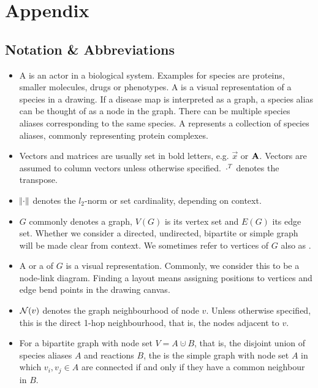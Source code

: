 \documentclass[
	fontsize=10pt, %
	twoside=true, %
	secnumdepth=1, %
  toc=indentunnumbered %
]{kaobook}
\begin{document}
\vfill
\pagebreak


\backmatter %

\appendix %



\chapter{Appendix}

\section{Notation \& Abbreviations}
\begin{itemize}
\item A  is an actor in a biological system. Examples for species
  are proteins, smaller molecules, drugs or phenotypes. A  is a visual representation of a species in a drawing. If a disease map
  is interpreted as a graph, a species alias can be thought of as a node in the
  graph. There can be multiple species
  aliases corresponding to the same species. A 
  represents a collection of species aliases, commonly representing protein
  complexes.
\item Vectors and matrices are usually set in bold letters, e.g. $\vec x$ or
  $\mathbf{A}$. Vectors are assumed to column vectors unless otherwise specified.
  $\cdot^T$ denotes the transpose.
\item $\norm{\cdot}$ denotes the $l_2$-norm or set cardinality, depending on context.
\item $G$ commonly denotes a graph, $V(G)$ is its vertex set and $E(G)$ its edge
  set. Whether we consider a directed, undirected, bipartite or simple graph
  will be made clear from context. We sometimes refer to vertices of $G$ also as
  . 
\item A  or a  of $G$ is a visual representation.
  Commonly, we consider this to be a node-link diagram. Finding a layout means
  assigning positions to vertices and edge bend points in the drawing canvas.
\item $\mathcal{N}(v)$ denotes the graph neighbourhood of node $v$. Unless otherwise
  specified, this is the direct 1-hop neighbourhood, that is, the nodes adjacent
  to $v$.
\item For a bipartite graph with node set $V = A \cupdot B$, that is, the
  disjoint union of species aliases $A$ and reactions $B$, the  is the simple graph with node set $A$ in which $v_i,
  v_j \in A$ are connected if and only if they have a common neighbour in $B$.
\end{itemize}
\end{document}
